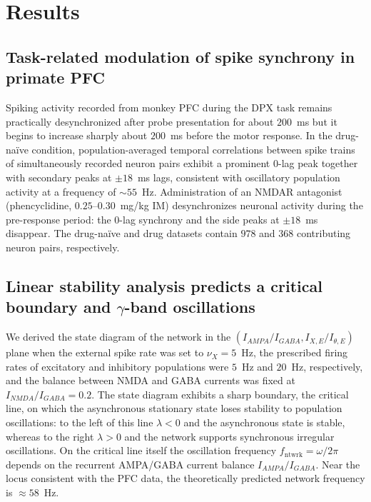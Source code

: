 \documentclass[11pt]{article}
\begin{document}
\section{Results}

\subsection{Task-related modulation of spike synchrony in primate PFC}

Spiking activity recorded from monkey PFC during the DPX task \citep{zick2018differential} remains practically desynchronized after probe presentation for about $200$~ms but it begins to increase sharply about $200$~ms before the motor response. In the drug-na\"ive condition, population-averaged temporal correlations between spike trains of simultaneously recorded neuron pairs exhibit a prominent $0$-lag peak together with secondary peaks at $\pm 18$~ms lags, consistent with oscillatory population activity at a frequency of $\sim 55$~Hz. Administration of an NMDAR antagonist (phencyclidine, $0.25$--$0.30$~mg/kg IM) desynchronizes neuronal activity during the pre-response period: the $0$-lag synchrony and the side peaks at $\pm 18$~ms disappear. The drug-na\"ive and drug datasets contain $978$ and $368$ contributing neuron pairs, respectively.

\subsection{Linear stability analysis predicts a critical boundary and $\gamma$-band oscillations}

We derived the state diagram of the network in the $(I_{AMPA}/I_{GABA}, I_{X,E}/I_{\theta,E})$ plane when the external spike rate was set to $\nu_X = 5$~Hz, the prescribed firing rates of excitatory and inhibitory populations were $5$~Hz and $20$~Hz, respectively, and the balance between NMDA and GABA currents was fixed at $I_{NMDA}/I_{GABA} = 0.2$. The state diagram exhibits a sharp boundary, the critical line, on which the asynchronous stationary state loses stability to population oscillations: to the left of this line $\lambda < 0$ and the asynchronous state is stable, whereas to the right $\lambda > 0$ and the network supports synchronous irregular oscillations. On the critical line itself the oscillation frequency $f_{\mathrm{ntwrk}} = \omega/2\pi$ depends on the recurrent AMPA/GABA current balance $I_{AMPA}/I_{GABA}$. Near the locus consistent with the PFC data, the theoretically predicted network frequency is $\approx 58$~Hz.
\end{document}
